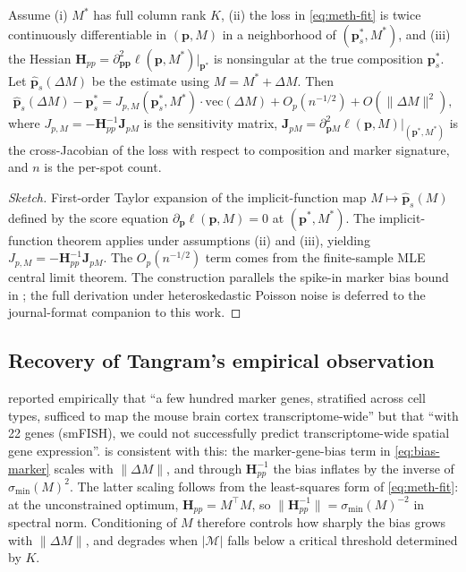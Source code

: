 \begin{theorem}
\label{thm:bias-marker}
Assume (i) $M^*$ has full column rank $K$, (ii) the loss in
\eqref{eq:meth-fit} is twice continuously differentiable in $(\bm{p}, M)$
in a neighborhood of $(\bm{p}_s^*, M^*)$, and (iii) the Hessian
$\bm{H}_{pp} = \partial^2_{\bm{p}\bm{p}} \ell(\bm{p}, M^*) \big|_{\bm{p}^*}$
is nonsingular at the true composition $\bm{p}_s^*$. Let
$\hat{\bm{p}}_s(\Delta M)$ be the estimate using $M = M^* + \Delta M$.
Then
\begin{equation}
  \hat{\bm{p}}_s(\Delta M) - \bm{p}_s^*
  = J_{p,M}(\bm{p}_s^*, M^*) \cdot \mathrm{vec}(\Delta M)
    + O_p(n^{-1/2}) + O(\|\Delta M\|^2),
  \label{eq:bias-marker}
\end{equation}
where $J_{p,M} = -\bm{H}_{pp}^{-1} \bm{J}_{pM}$ is the
sensitivity matrix, $\bm{J}_{pM} = \partial^2_{\bm{p} M}
\ell(\bm{p}, M)\big|_{(\bm{p}^*, M^*)}$ is the cross-Jacobian of the
loss with respect to composition and marker signature, and $n$ is the
per-spot count.
\end{theorem}

\begin{proof}[Sketch]
First-order Taylor expansion of the implicit-function map $M \mapsto
\hat{\bm{p}}_s(M)$ defined by the score equation
$\partial_{\bm{p}} \ell(\bm{p}, M) = 0$ at $(\bm{p}^*, M^*)$.
The implicit-function theorem applies under assumptions (ii) and
(iii), yielding $J_{p,M} = -\bm{H}_{pp}^{-1} \bm{J}_{pM}$. The
$O_p(n^{-1/2})$ term comes from the finite-sample MLE central limit
theorem. The construction parallels the spike-in marker bias bound
in \cite[\S 7]{towell2026scrnacoarsening}; the full derivation under
heteroskedastic Poisson noise is deferred to the journal-format
companion to this work.
\end{proof}

\subsection{Recovery of Tangram's empirical observation}

\citet{biancalani2021deep} reported empirically that ``a few hundred
marker genes, stratified across cell types, sufficed to map the
mouse brain cortex transcriptome-wide'' but that ``with 22 genes
(smFISH), we could not successfully predict transcriptome-wide
spatial gene expression''.  is consistent with
this: the marker-gene-bias term in
\eqref{eq:bias-marker} scales with $\|\Delta M\|$, and through
$\bm{H}_{pp}^{-1}$ the bias inflates by the inverse of
$\sigma_{\min}(M)^2$. The latter scaling follows from the
least-squares form of \eqref{eq:meth-fit}: at the unconstrained
optimum, $\bm{H}_{pp} = M^\top M$, so $\|\bm{H}_{pp}^{-1}\| =
\sigma_{\min}(M)^{-2}$ in spectral norm. Conditioning of $M$
therefore controls how sharply the bias grows with $\|\Delta M\|$,
and degrades when $|\mathcal{M}|$ falls below a critical threshold
determined by $K$.


